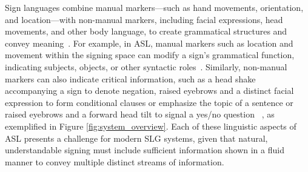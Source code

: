 Sign languages combine manual markers---such as hand movements, orientation, and location---with non-manual markers, including facial expressions, head movements, and other body language, to create grammatical structures and convey meaning~\cite{Stokoe1961SignLS,brentari1998prosodic,sandler2006sign}. For example, in ASL, manual markers such as location and movement within the signing space can modify a sign's grammatical function, indicating subjects, objects, or other syntactic roles~\cite{Stokoe1961SignLS}. Similarly, non-manual markers can also indicate critical information, such as a head shake accompanying a sign to denote negation, raised eyebrows and a distinct facial expression to form conditional clauses or emphasize the topic of a sentence or raised eyebrows and a forward head tilt to signal a yes/no question ~\cite{baker1991american,baker1985facial, sandler2006sign}, as exemplified in Figure \ref{fig:system_overview}. Each of these linguistic aspects of ASL presents a challenge for modern SLG systems, given that natural, understandable signing must include sufficient information shown in a fluid manner to convey multiple distinct streams of information.

